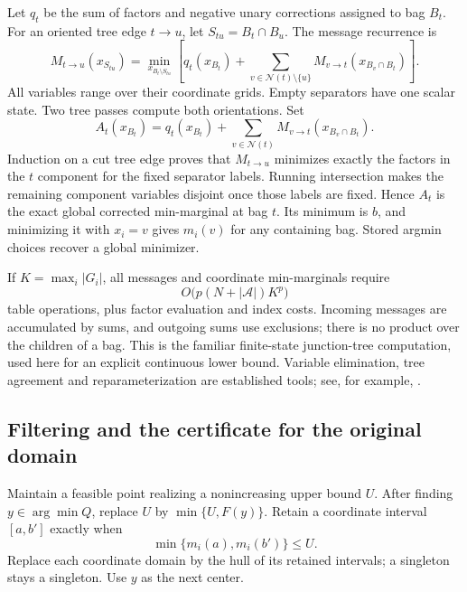 \documentclass[11pt]{article}
\theoremstyle{remark}
\begin{document}
Let $q_t$ be the sum of factors and negative unary corrections assigned
to bag $B_t$. For an oriented tree edge $t\to u$, let
$S_{tu}=B_t\cap B_u$. The message recurrence is
\begin{equation}\label{eq:messages}
M_{t\to u}(x_{S_{tu}})=
\min_{x_{B_t\setminus S_{tu}}}
\left[q_t(x_{B_t})+
\sum_{v\in\mathcal N(t)\setminus\{u\}}
M_{v\to t}(x_{B_v\cap B_t})\right].
\end{equation}
All variables range over their coordinate grids. Empty separators have
one scalar state. Two tree passes compute both orientations. Set
\begin{equation}\label{eq:calibrated}
A_t(x_{B_t})=q_t(x_{B_t})+
\sum_{v\in\mathcal N(t)}M_{v\to t}(x_{B_v\cap B_t}).
\end{equation}
Induction on a cut tree edge proves that $M_{t\to u}$ minimizes exactly
the factors in the $t$ component for the fixed separator labels. Running
intersection makes the remaining component variables disjoint once those
labels are fixed. Hence $A_t$ is the exact global corrected min-marginal
at bag $t$. Its minimum is $b$, and minimizing it with $x_i=v$ gives
$m_i(v)$ for any containing bag. Stored argmin choices recover a global
minimizer.

If $K=\max_i|G_i|$, all messages and coordinate min-marginals require
\begin{equation}\label{eq:dpwork}
O\bigl(p(N+|\mathcal A|)K^p\bigr)
\end{equation}
table operations, plus factor evaluation and index costs. Incoming
messages are accumulated by sums, and outgoing sums use exclusions;
there is no product over the children of a bag. This is the familiar
finite-state junction-tree computation, used here for an explicit
continuous lower bound. Variable elimination, tree agreement and
reparameterization are established tools; see, for example,
\cite{Dechter1999,WainwrightJaakkolaWillsky2005}.

\subsection{Filtering and the certificate for the original domain}

Maintain a feasible point realizing a nonincreasing upper bound $U$.
After finding $y\in\arg\min Q$, replace $U$ by $\min\{U,F(y)\}$.
Retain a coordinate interval $[a,b']$ exactly when
\begin{equation}\label{eq:retain}
\min\{m_i(a),m_i(b')\}\le U.
\end{equation}
Replace each coordinate domain by the hull of its retained intervals;
a singleton stays a singleton. Use $y$ as the next center.
\end{document}
